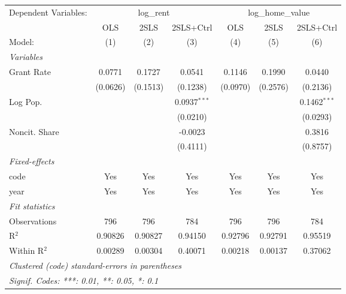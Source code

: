 
\begingroup
\centering
\begin{adjustbox}{max width=\textwidth}
\begin{tabular}{lcccccc}
   \tabularnewline \midrule \midrule
   Dependent Variables: & \multicolumn{3}{c}{log\_rent} & \multicolumn{3}{c}{log\_home\_value}\\
                 & OLS      & 2SLS     & 2SLS+Ctrl      & OLS      & 2SLS     & 2SLS+Ctrl \\   
   Model:        & (1)      & (2)      & (3)            & (4)      & (5)      & (6)\\  
   \midrule
   \emph{Variables}\\
   Grant Rate    & 0.0771   & 0.1727   & 0.0541         & 0.1146   & 0.1990   & 0.0440\\   
                 & (0.0626) & (0.1513) & (0.1238)       & (0.0970) & (0.2576) & (0.2136)\\   
   Log Pop.      &          &          & 0.0937$^{***}$ &          &          & 0.1462$^{***}$\\   
                 &          &          & (0.0210)       &          &          & (0.0293)\\   
   Noncit. Share &          &          & -0.0023        &          &          & 0.3816\\   
                 &          &          & (0.4111)       &          &          & (0.8757)\\   
   \midrule
   \emph{Fixed-effects}\\
   code          & Yes      & Yes      & Yes            & Yes      & Yes      & Yes\\  
   year          & Yes      & Yes      & Yes            & Yes      & Yes      & Yes\\  
   \midrule
   \emph{Fit statistics}\\
   Observations  & 796      & 796      & 784            & 796      & 796      & 784\\  
   R$^2$         & 0.90826  & 0.90827  & 0.94150        & 0.92796  & 0.92791  & 0.95519\\  
   Within R$^2$  & 0.00289  & 0.00304  & 0.40071        & 0.00218  & 0.00137  & 0.37062\\  
   \midrule \midrule
   \multicolumn{7}{l}{\emph{Clustered (code) standard-errors in parentheses}}\\
   \multicolumn{7}{l}{\emph{Signif. Codes: ***: 0.01, **: 0.05, *: 0.1}}\\
\end{tabular}
\end{adjustbox}
\par\endgroup



